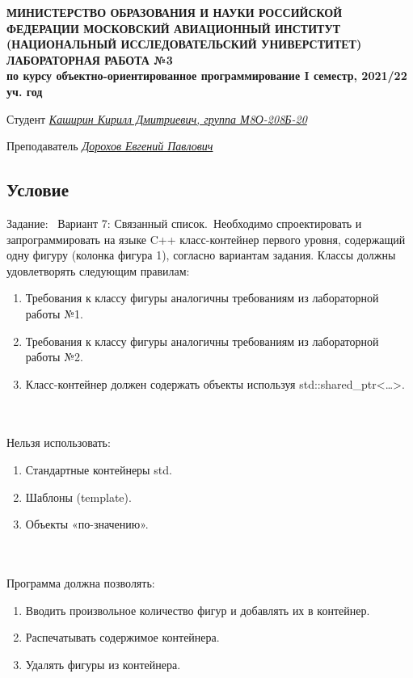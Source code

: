 \documentclass[12pt]{article}
\begin{document}
\begin{titlepage}
\begin{center}
\textbf{МИНИСТЕРСТВО ОБРАЗОВАНИЯ И НАУКИ РОССИЙСКОЙ ФЕДЕРАЦИИ
\medskip
МОСКОВСКИЙ АВИАЦИОННЫЙ ИНСТИТУТ
(НАЦИОНАЛЬНЫЙ ИССЛЕДОВАТЕЛЬСКИЙ УНИВЕРСТИТЕТ)
\vfill\vfill
{\Huge ЛАБОРАТОРНАЯ РАБОТА №3} \\
по курсу объектно-ориентированное программирование
I семестр, 2021/22 уч. год}
\end{center}
\vfill

Студент \uline{\it {Каширин Кирилл Дмитриевич, группа М8О-208Б-20}\hfill}

Преподаватель \uline{\it {Дорохов Евгений Павлович}\hfill}

\vfill
\end{titlepage}

\subsection*{Условие}

Задание: \
Вариант 7: Связанный список.\
Необходимо спроектировать и запрограммировать на языке C++ класс-контейнер первого уровня, содержащий одну фигуру (колонка фигура 1), согласно вариантам задания. Классы должны удовлетворять следующим правилам:
\begin{enumerate}
\item Требования к классу фигуры аналогичны требованиям из лабораторной работы №1.
\item Требования к классу фигуры аналогичны требованиям из лабораторной работы №2.
\item Класс-контейнер должен содержать объекты используя std::shared\_ptr<…>.
\end{enumerate}
\\ \\
Нельзя использовать:
\begin{enumerate}
\item Стандартные контейнеры std.
\item Шаблоны (template).
\item Объекты «по-значению».
\end{enumerate}
\\ \\
Программа должна позволять:
\begin{enumerate}
\item Вводить произвольное количество фигур и добавлять их в контейнер.
\item Распечатывать содержимое контейнера.
\item Удалять фигуры из контейнера.
\end{enumerate}
\end{document}
